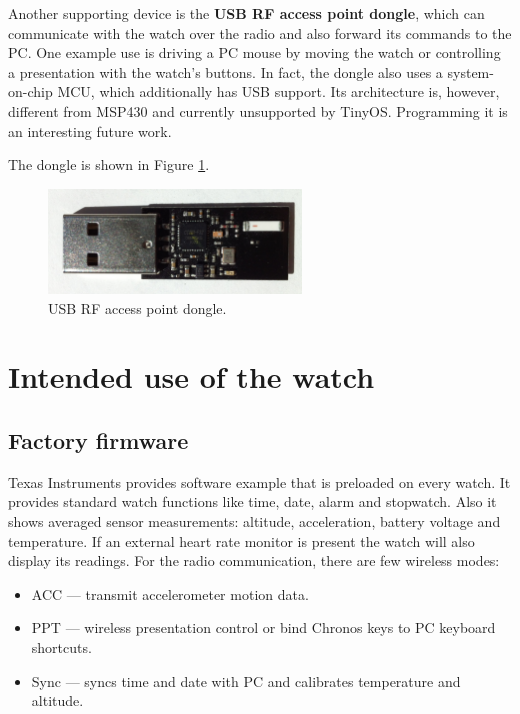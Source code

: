 Another supporting device is the {\bf USB RF access point dongle},
which can communicate with the watch over the radio and also forward
its commands to the PC. One example use is driving a PC mouse by
moving the watch or controlling a presentation with the watch's
buttons. In fact, the dongle also uses a system-on-chip MCU, which
additionally has USB support. Its architecture is, however, different
from MSP430 and currently unsupported by TinyOS. Programming it is an
interesting future work.

The dongle is shown in Figure \ref{fig:chronos_rfdongle}.

\begin{figure}[h]
  \centering
  \includegraphics[width=0.6\textwidth]{img/chronos_rfdongle.jpg}
  \caption{USB RF access point dongle.}
  \label{fig:chronos_rfdongle}
\end{figure}

\section{Intended use of the watch}

\subsection{Factory firmware}

Texas Instruments provides software example that is preloaded on every
watch. It provides standard watch functions like time, date, alarm and
stopwatch. Also it shows averaged sensor measurements: altitude,
acceleration, battery voltage and temperature. If an external  heart
rate monitor is present the watch will also display its readings. For
the radio communication, there are few wireless modes:

\begin{itemize}
  \item ACC --- transmit accelerometer motion data.
  \item PPT --- wireless presentation control or bind Chronos
    keys to PC keyboard shortcuts.
  \item Sync --- syncs time and date with PC and calibrates
    temperature and altitude.
\end{itemize}

